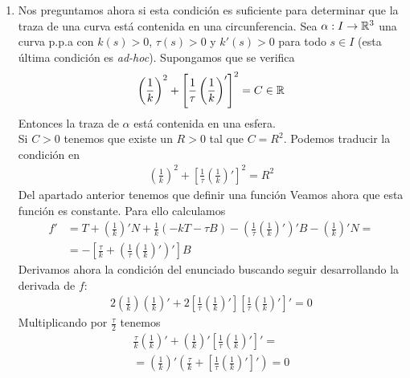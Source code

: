 \begin{ejercicio}
\begin{enumerate}
        \item[7 bis.] Nos preguntamos ahora si esta condición es suficiente para determinar que la traza de una curva está contenida en una circunferencia. Sea $\alpha: I \to \mathbb{R}^3$ una curva p.p.a con $k(s)>0$, $\tau(s)>0$ y $k'(s)>0$ para todo $s\in I$ (esta última condición es \textit{ad-hoc}). Supongamos que se verifica
        \begin{gather*}
            \left(\frac{1}{k}\right)^2 + \left[\frac{1}{\tau}\left(\frac{1}{k}\right)'\right]^2 = C \in \mathbb{R}
        \end{gather*}
        Entonces la traza de $\alpha$ está contenida en una esfera.\\

        Si $C>0$ tenemos que existe un $R>0$ tal que $C = R^2$. Podemos traducir la condición en 
        \begin{gather*}
            \left(\frac{1}{k}\right)^2 + \left[\frac{1}{\tau}\left(\frac{1}{k}\right)'\right]^2 = R^2
        \end{gather*}
        Del apartado anterior tenemos que definir una función
        Veamos ahora que esta función es constante. Para ello calculamos 
        \begin{align*}
            f' &= T + \left(\frac{1}{k}\right)' N + \frac{1}{k}(-k T - \tau B) - \left(\frac{1}{\tau}\left(\frac{1}{k}\right)'\right)'B - \left(\frac{1}{k}\right)' N =\\
            &= - \left[ \frac{\tau}{k} + \left(\frac{1}{\tau}\left(\frac{1}{k}\right)'\right)' \right]B
        \end{align*}
        Derivamos ahora la condición del enunciado buscando seguir desarrollando la derivada de $f$:
        \begin{gather*}
            2 \left(\frac{1}{k}\right) \left(\frac{1}{k}\right)' + 2 \left[\frac{1}{\tau} \left(\frac{1}{k}\right)'\right]\left[\frac{1}{\tau} \left(\frac{1}{k}\right)'\right]' = 0
        \end{gather*}
        Multiplicando por $\frac{\tau}{2}$ tenemos 
        \begin{gather*}
            \frac{\tau}{k} \left(\frac{1}{k}\right)' +  \left(\frac{1}{k}\right)'\left[\frac{1}{\tau} \left(\frac{1}{k}\right)'\right]' = \\
            = \left(\frac{1}{k}\right)' \left(\frac{\tau}{k} + \left[\frac{1}{\tau} \left(\frac{1}{k}\right)' \right]'\right) = 0
        \end{gather*}

\end{enumerate}
\end{ejercicio}
